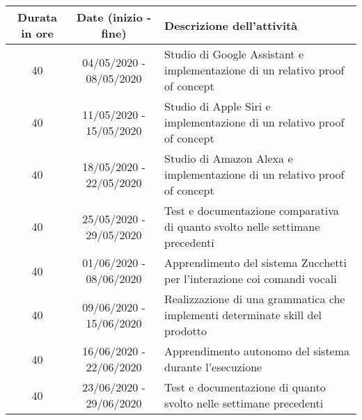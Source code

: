 

\begin{tabularx}{\textwidth}{|c|c|X|}
	\hline
	\textbf{Durata in ore} & \textbf{Date (inizio - fine)} & \textbf{Descrizione dell'attività} \\\hline
	
	40 & 04/05/2020 - 08/05/2020 & Studio di Google Assistant e implementazione di un relativo proof of concept \\
	\hline
    40 & 11/05/2020 - 15/05/2020 & Studio di Apple Siri e implementazione di un relativo proof of concept \\
    \hline
    40 & 18/05/2020 - 22/05/2020 & Studio di Amazon Alexa e implementazione di un relativo proof of concept \\
    \hline
    40 & 25/05/2020 - 29/05/2020 & Test e documentazione comparativa di quanto svolto nelle settimane precedenti \\
    \hline
    40 & 01/06/2020 - 08/06/2020 & Apprendimento del sistema Zucchetti per l'interazione coi comandi vocali \\
    \hline
    40 & 09/06/2020 - 15/06/2020 & Realizzazione di una grammatica che implementi determinate skill del prodotto \\
    \hline
    40 & 16/06/2020 - 22/06/2020 & Apprendimento autonomo del sistema durante l'esecuzione \\
    \hline
    40 & 23/06/2020 - 29/06/2020 & Test e documentazione di quanto svolto nelle settimane precedenti \\	
    \hline
\end{tabularx}